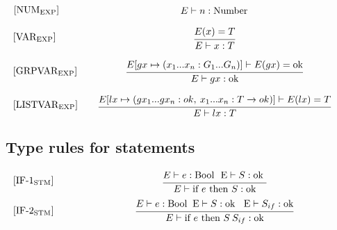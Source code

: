\begin{equation}
\begin{minipage}{.2\linewidth}
$[\text{NUM}_\text{EXP}]$
\end{minipage}
\begin{minipage}{.8\linewidth}
\centering
$E \vdash n : \text{Number}$
\end{minipage}
\end{equation}

\begin{equation}
\begin{minipage}{.2\linewidth}
$[\text{VAR}_\text{EXP}]$
\end{minipage}
\begin{minipage}{.8\linewidth}
\centering
$\cfrac{E(x) = T} {E \vdash x : T}$
\end{minipage}
\end{equation}

\begin{equation}\label{app:GrpVar}
\begin{minipage}{.2\linewidth}
$[\text{GRPVAR}_\text{EXP}]$
\end{minipage}
\begin{minipage}{.8\linewidth}
\centering
$\cfrac{E[gx \mapsto (x_1...x_n : G_1...G_n)] \vdash E(gx) = \text{ok} } {E \vdash gx : \text{ok}}$
\end{minipage}
\end{equation}

\begin{equation}
\begin{minipage}{.2\linewidth}
$[\text{LISTVAR}_\text{EXP}]$
\end{minipage}
\begin{minipage}{.8\linewidth}
\centering
$\cfrac{E[lx \mapsto (gx_1...gx_n : ok,\: x_1...x_n : T \xrightarrow{} ok)] \vdash E(lx) = T } {E \vdash lx : T}$
\end{minipage}
\end{equation}
\noindent
\subsection{Type rules for statements}
\begin{equation}
\begin{minipage}{.2\linewidth}
$[\text{IF-1}_\text{STM}]$
\end{minipage}
\begin{minipage}{.8\linewidth}
\centering
$\cfrac{E \vdash e : \text{Bool } \text{ E} \vdash S : \text{ok }}{E \vdash \text{if } e \text{ then } S : \text{ok}}$
\end{minipage}
\end{equation}
\begin{equation}
\begin{minipage}{.2\linewidth}
$[\text{IF-2}_\text{STM}]$
\end{minipage}
\begin{minipage}{.8\linewidth}
\centering
$\cfrac{E \vdash e : \text{Bool } \: \text{E} \vdash S : \text{ok } \: \text{ E} \vdash S_{if} : \text{ok}}{E \vdash \text{if } e \text{ then } S \: S_{if} : \text{ok}}$
\end{minipage}
\end{equation}

